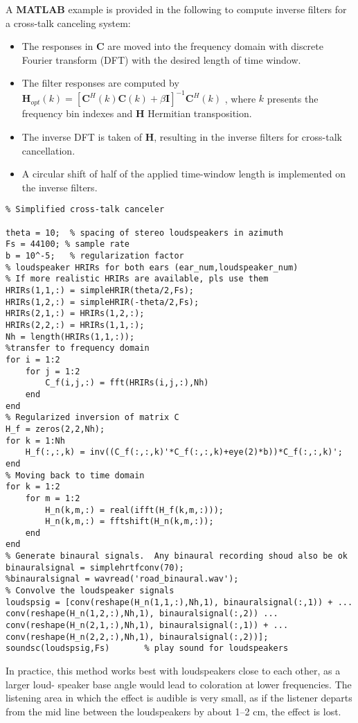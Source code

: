 \documentclass[10pt,a4paper,oneside]{article}
\begin{document}
A {\bfseries MATLAB} example is provided in the following to compute inverse filters for a cross-talk canceling system:
\begin{itemize}
\item The responses in $\mathbf{C}$ are moved into the frequency domain with discrete Fourier transform (DFT) with the desired length of time window.
\item The filter responses are computed by $\mathbf{H}_{o p t}(k)=\left[\mathbf{C}^{H}(k) \mathbf{C}(k)+\beta \mathbf{I}\right]^{-1} \mathbf{C}^{H}(k)$ , where $k$ presents the frequency bin indexes and $\mathbf{H}$ Hermitian transposition.
\item The inverse DFT is taken of $\mathbf{H}$, resulting in the inverse filters for cross-talk cancellation.
\item A circular shift of half of the applied time-window length is implemented on the inverse filters.
\end{itemize}
\begin{lstlisting}
% Simplified cross-talk canceler 

theta = 10;  % spacing of stereo loudspeakers in azimuth 
Fs = 44100; % sample rate
b = 10^-5;   % regularization factor
% loudspeaker HRIRs for both ears (ear_num,loudspeaker_num)
% If more realistic HRIRs are available, pls use them
HRIRs(1,1,:) = simpleHRIR(theta/2,Fs); 
HRIRs(1,2,:) = simpleHRIR(-theta/2,Fs); 
HRIRs(2,1,:) = HRIRs(1,2,:);
HRIRs(2,2,:) = HRIRs(1,1,:);
Nh = length(HRIRs(1,1,:));
%transfer to frequency domain
for i = 1:2
	for j = 1:2
		C_f(i,j,:) = fft(HRIRs(i,j,:),Nh)
	end
end
% Regularized inversion of matrix C
H_f = zeros(2,2,Nh);
for k = 1:Nh
	H_f(:,:,k) = inv((C_f(:,:,k)'*C_f(:,:,k)+eye(2)*b))*C_f(:,:,k)';
end
% Moving back to time domain
for k = 1:2
	for m = 1:2
		H_n(k,m,:) = real(ifft(H_f(k,m,:)));
		H_n(k,m,:) = fftshift(H_n(k,m,:));
	end
end
% Generate binaural signals.  Any binaural recording shoud also be ok
binauralsignal = simplehrtfconv(70);
%binauralsignal = wavread('road_binaural.wav');
% Convolve the loudspeaker signals
loudspsig = [conv(reshape(H_n(1,1,:),Nh,1), binauralsignal(:,1)) + ...
conv(reshape(H_n(1,2,:),Nh,1), binauralsignal(:,2)) ...
conv(reshape(H_n(2,1,:),Nh,1), binauralsignal(:,1)) + ...
conv(reshape(H_n(2,2,:),Nh,1), binauralsignal(:,2))];
soundsc(loudspsig,Fs)       % play sound for loudspeakers

\end{lstlisting}

In practice, this method works best with loudspeakers close to each other, as a larger loud- speaker base angle would lead to coloration at lower frequencies. The listening area in which the effect is audible is very small, as if the listener departs from the mid line between the loudspeakers by about 1–2 cm, the effect is lost.
\end{document}
